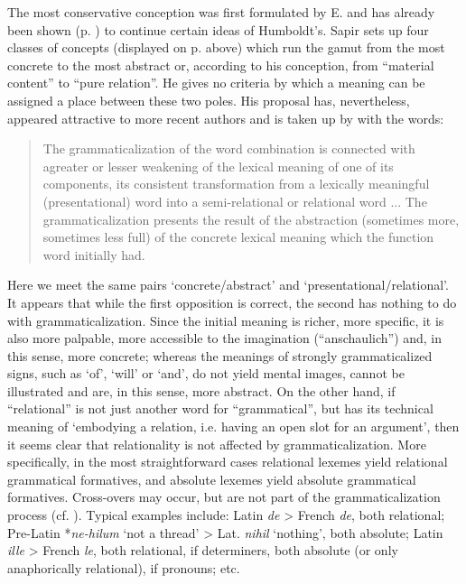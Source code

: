 The most conservative conception was first formulated by E. \citet[Ch.~V]{Sapir1921} and has already been shown (p. \pageref{SapirHumCh4}) to continue certain ideas of Humboldt's. Sapir sets up four classes of concepts (displayed on p. \pageref{SapirHumCh4} above) which run the gamut from the most concrete to the most abstract or, according to his conception, from “material content” to “pure relation”. He gives no criteria by which a meaning can be assigned a place between these two poles. His proposal has, nevertheless, appeared attractive to more recent authors and is taken up by \citet[83]{Žirmunskij1966} with the words:

\begin{quotation}
The grammaticalization of the word combination is connected with a\linebreak greater or lesser weakening of the lexical meaning of one of its components, its consistent transformation from a lexically meaningful (presentational) word into a semi-relational or relational word ... The grammaticalization presents the result of the abstraction (sometimes more, sometimes less full) of the concrete lexical meaning which the function word initially had.
\end{quotation}

\noindent Here we meet the same pairs ‘concrete/abstract’ and ‘presentational/relational’. It appears that while the first opposition is correct, the second has nothing to do with grammaticalization. Since the initial meaning is richer, more specific, it is also more palpable, more accessible to the imagination (“anschaulich”) and, in this sense, more concrete; whereas the meanings of strongly grammaticalized signs, such as ‘of’, ‘will’ or ‘and’, do not yield mental images, cannot be illustrated and are, in this sense, more abstract. On the other hand, if ``relational'' is not just another word for ``grammatical'', but has its technical meaning of ‘embodying a relation, i.e. having an open slot for an argument’, then it seems clear that relationality is not affected by grammaticalization. More specifically, in the most straightforward cases relational lexemes yield relational grammatical formatives, and absolute lexemes yield absolute grammatical formatives. Cross-overs may occur, but are not part of the grammaticalization process (cf. \pageref{page73}\chk%
). Typical examples include: Latin \textit{de} {\textgreater} French \textit{de}, both relational; Pre-Latin *\textit{ne-hilum} ‘not a thread’ {\textgreater} Lat. \textit{nihil} ‘nothing’, both absolute; Latin \textit{ille} {\textgreater} French \textit{le}, both relational, if determiners, both absolute (or only anaphorically relational), if pronouns; etc.

